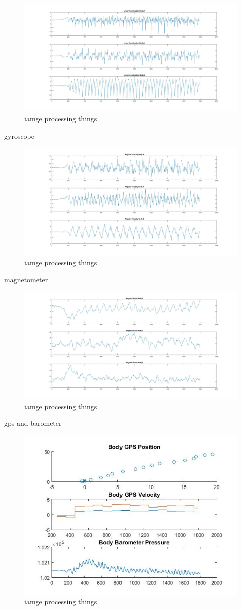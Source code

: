 \begin{figure}[!ht] 
\captionsetup{width=0.8\linewidth, font=small}  
\includegraphics[width=0.5\linewidth]{figures/accelerometer.jpg}
\caption{iamge processing things}
\label{fig:accelerometer}
\end{figure}

gyroscope

\begin{figure}[!ht] 
\captionsetup{width=0.8\linewidth, font=small}  
\includegraphics[width=0.5\linewidth]{figures/gyroscope.jpg}
\caption{iamge processing things}
\label{fig:gyroscope}
\end{figure}

magnetometer

\begin{figure}[!ht] 
\captionsetup{width=0.8\linewidth, font=small}  
\includegraphics[width=0.5\linewidth]{figures/magnetometer.jpg}
\caption{iamge processing things}
\label{fig:magnetometer}
\end{figure}

gps and barometer

\begin{figure}[!ht] 
\captionsetup{width=0.8\linewidth, font=small}  
\includegraphics[width=0.5\linewidth]{figures/gps.jpg}
\caption{iamge processing things}
\label{fig:gps}
\end{figure}





